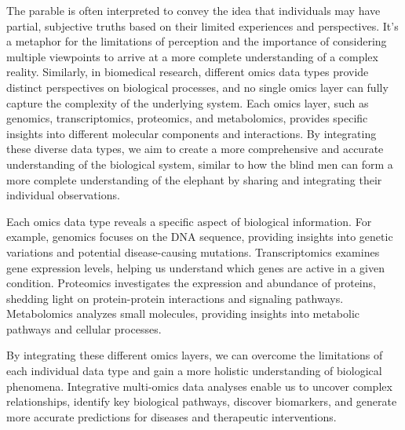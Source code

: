 \documentclass[a4paper, nobind]{templates/ociamthesis}
\begin{document}
The parable is often interpreted to convey the idea that individuals may have partial, subjective truths based on their limited experiences and perspectives. It's a metaphor for the limitations of perception and the importance of considering multiple viewpoints to arrive at a more complete understanding of a complex reality. Similarly, in biomedical research, different omics data types provide distinct perspectives on biological processes, and no single omics layer can fully capture the complexity of the underlying system. Each omics layer, such as genomics, transcriptomics, proteomics, and metabolomics, provides specific insights into different molecular components and interactions. By integrating these diverse data types, we aim to create a more comprehensive and accurate understanding of the biological system, similar to how the blind men can form a more complete understanding of the elephant by sharing and integrating their individual observations.

Each omics data type reveals a specific aspect of biological information. For example, genomics focuses on the DNA sequence, providing insights into genetic variations and potential disease-causing mutations. Transcriptomics examines gene expression levels, helping us understand which genes are active in a given condition. Proteomics investigates the expression and abundance of proteins, shedding light on protein-protein interactions and signaling pathways. Metabolomics analyzes small molecules, providing insights into metabolic pathways and cellular processes.

By integrating these different omics layers, we can overcome the limitations of each individual data type and gain a more holistic understanding of biological phenomena. Integrative multi-omics data analyses enable us to uncover complex relationships, identify key biological pathways, discover biomarkers, and generate more accurate predictions for diseases and therapeutic interventions.
\end{document}
